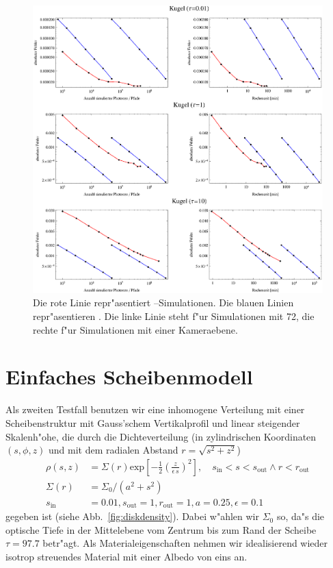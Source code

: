 		\begin{figure}
			\centering
			\includegraphics[width=1.0\textwidth]{sphereerrorplots.eps}
			\caption{Die rote Linie repr"asentiert \pirate--Simulationen. Die blauen Linien repr"asentieren \mctd. Die linke Linie steht f"ur Simulationen mit 72, die rechte f"ur Simulationen mit einer Kameraebene.}
			\label{fig:sphere_errors}
		\end{figure}


	\section{Einfaches Scheibenmodell}
	Als zweiten Testfall benutzen wir eine inhomogene Verteilung mit einer Scheibenstruktur mit Gauss'schem Vertikalprofil und linear steigender Skalenh"ohe, die durch die Dichteverteilung (in zylindrischen Koordinaten $(s,\phi,z)$ und mit dem radialen Abstand $r=\sqrt{s^2+z^2}$)
	\begin{align*}
		\rho(s,z)&=\Sigma(r)\text{exp}\left[-\frac{1}{2}\left(\frac{z}{\epsilon\,s}\right)^2\right],\quad s_\text{in}<s<s_\text{out}\land r<r_\text{out} \\
		\Sigma(r)&=\Sigma_0 / (a^2+s^2) \\
		s_\text{in}&=0.01, s_\text{out}=1, r_\text{out}=1, a=0.25, \epsilon=0.1
	\end{align*}
	gegeben ist (siehe Abb.~\ref{fig:diskdensity}).	Dabei w"ahlen wir $\Sigma_0$ so, da"s die optische Tiefe in der Mittelebene vom Zentrum bis zum Rand der Scheibe $\tau=97.7$ betr"agt. Als Materialeigenschaften nehmen wir idealisierend wieder isotrop streuendes Material mit einer Albedo von eins an.
	
